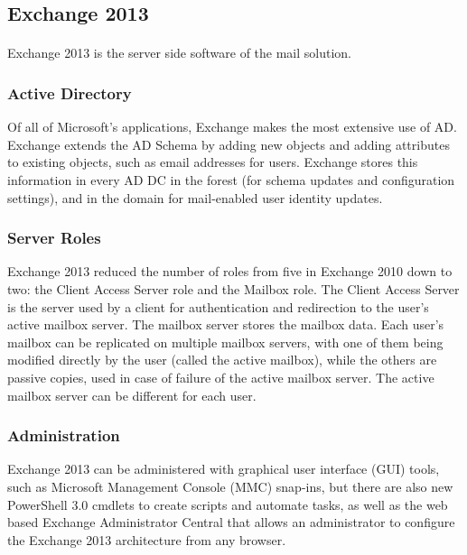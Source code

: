 \subsection{Exchange 2013}
\paragraph{}
Exchange 2013 is the server side software of the mail solution.


\subsubsection{Active Directory}
Of all of Microsoft's applications, Exchange makes the most extensive use of AD. 
Exchange extends the AD Schema by adding new objects and adding attributes to existing objects, such as email addresses for users.
Exchange stores this information in every AD DC in the forest (for schema updates and configuration settings), and in the domain for mail-enabled user identity updates\cite[Ch. 1]{redmond_microsoft_2010}.

\subsubsection{Server Roles}
Exchange 2013 reduced the number of roles from five in Exchange 2010 down to two: the Client Access Server role and the Mailbox role. The Client Access Server is the server used by a client for authentication and redirection to the user's active mailbox server. The mailbox server stores the mailbox data. Each user's mailbox can be replicated on multiple mailbox servers, with one of them being modified directly by the user (called the active mailbox), while the others are passive copies, used in case of failure of the active mailbox server. The active mailbox server can be different for each user\cite[Ch. 1]{redmond_microsoft_2010}.

\subsubsection{Administration}
Exchange 2013 can be administered with graphical user interface (GUI) tools, such as Microsoft Management Console (MMC) snap-ins, but there are also new PowerShell 3.0 cmdlets to create scripts and automate tasks, as well as the web based Exchange Administrator Central that allows an administrator to configure the Exchange 2013 architecture from any browser\cite[Ch. 3\&5]{redmond_microsoft_2010}.



